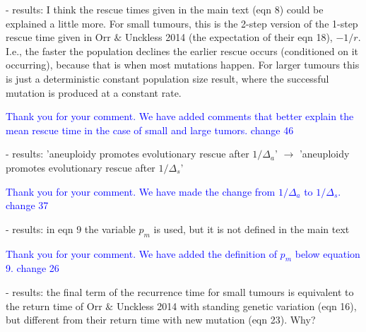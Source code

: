 \documentclass[11pt,a4paper]{article}
\begin{document}
- results: I think the rescue times given in the main text (eqn 8) could be explained a little more. For small tumours, this is the 2-step version of the 1-step rescue time given in Orr $\&$ Unckless 2014 (the expectation of their eqn 18), $-1/r$. I.e., the faster the population declines the earlier rescue occurs (conditioned on it occurring), because that is when most mutations happen. For larger tumours this is just a deterministic constant population size result, where the successful mutation is produced at a constant rate.

\textcolor{blue}{Thank you for your comment. We have added comments that better explain the mean rescue time in the case of small and large tumors. change 46} 


- results: 'aneuploidy promotes evolutionary rescue after $1/\Delta_a$' $\rightarrow$ 'aneuploidy promotes evolutionary rescue after $1/\Delta_s$'

\textcolor{blue}{Thank you for your comment. We have made the change from $1/\Delta_a$ to $1/\Delta_s$. change 37} 

- results: in eqn 9 the variable $p_m$ is used, but it is not defined in the main text

\textcolor{blue}{Thank you for your comment. We have added the definition of $p_m$ below equation 9. change 26} 

- results: the final term of the recurrence time for small tumours is equivalent to the return time of Orr $\&$ Unckless 2014 with standing genetic variation (eqn 16), but different from their return time with new mutation (eqn 23). Why?
\end{document}
